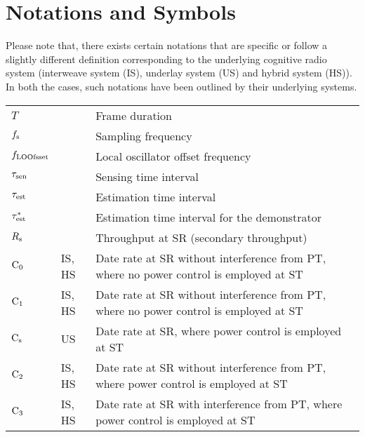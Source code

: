 
\chapter{Notations and Symbols}

Please note that, there exists certain notations that are specific or follow a slightly different definition corresponding to the underlying cognitive radio system (interweave system (IS), underlay system (US) and hybrid system (HS)). In both the cases, such notations have been outlined by their underlying systems.  

\renewcommand{\arraystretch}{1.4}
\begin{longtable}{p{}p{}p{}}

       $T$                     & &             Frame duration \\
       $f_{\text{s}}$                 & &             Sampling frequency \\
       $f_{\text{LOOfsset}}$                  & & 	       Local oscillator offset frequency \\
       $\tau_{\text{sen}}$                 & &             Sensing time interval \\
       $\tau_{\text{est}}$                 & &             Estimation time interval \\      
       ${\tau}^*_{\text{est}}$               & &             Estimation time interval for the demonstrator \\      
       $R_{\text{s}}$                   & &             Throughput at SR (secondary throughput) \\
       $\text{C}_{\text{0}}$                   & IS, HS &      Date rate at SR without interference from PT, where no power control is employed at ST  \\
       $\text{C}_{\text{1}}$                   & IS, HS &      Date rate at SR without interference from PT, where no power control is employed at ST \\ 
       $\text{C}_{\text{s}}$                   & US &          Date rate at SR, where power control is employed at ST \\
       $\text{C}_{\text{2}}$                   & IS, HS &      Date rate at SR without interference from PT, where power control is employed at ST  \\
       $\text{C}_{\text{3}}$                   & IS, HS &      Date rate at SR with interference from PT, where power control is employed at ST  \\ 


\end{longtable}
